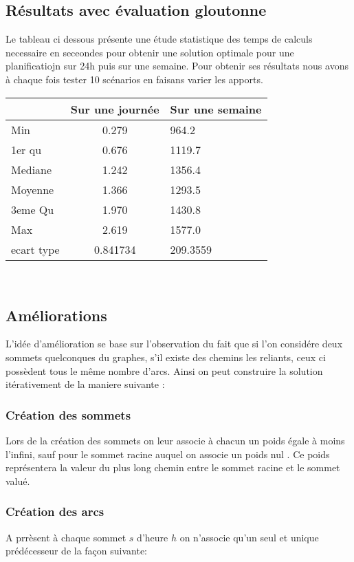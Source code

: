 \documentclass[a4paper]{report}
\begin{document}
\subsection{Résultats avec évaluation gloutonne}
Le tableau ci dessous présente une étude statistique des temps de calculs necessaire en seceondes pour obtenir une solution optimale pour une planificatiojn sur 24h puis sur une semaine. Pour obtenir ses résultats nous avons à chaque fois tester 10 scénarios en faisans varier les apports.\\
\begin{tabular}{|l|c|l|}
  \hline
  &Sur une journée&Sur une semaine\\
  \hline
  Min &0.279 &964.2\\
  \hline
  1er qu & 0.676&1119.7 
\\
  \hline
  Mediane & 1.242&1356.4 
\\
  \hline
  Moyenne &1.366 & 1293.5
\\
  \hline
  3eme Qu &1.970&1430.8\\
  \hline
  Max & 2.619 &1577.0\\
\hline
 ecart type & 0.841734 & 209.3559\\
 
  \hline
\end{tabular}
\\
\subsection{Améliorations}
L'idée d'amélioration se base sur l'observation du fait que si l'on considére deux sommets quelconques du graphes, s'il existe des chemins les reliants, ceux ci possèdent tous le même nombre d'arcs. Ainsi on peut construire la solution itérativement de la maniere suivante :\\
\subsubsection*{Création des sommets}
Lors de la création des sommets on leur associe à chacun un poids égale à moins l'infini, sauf pour le sommet racine auquel on associe un poids nul . Ce poids représentera la valeur du plus long chemin entre le sommet racine et le sommet valué.\\
\subsubsection*{Création des arcs}
A prrèsent à chaque sommet $s$ d'heure $h$ on n'associe qu'un seul et unique prédécesseur de la façon suivante: \\
\end{document}
